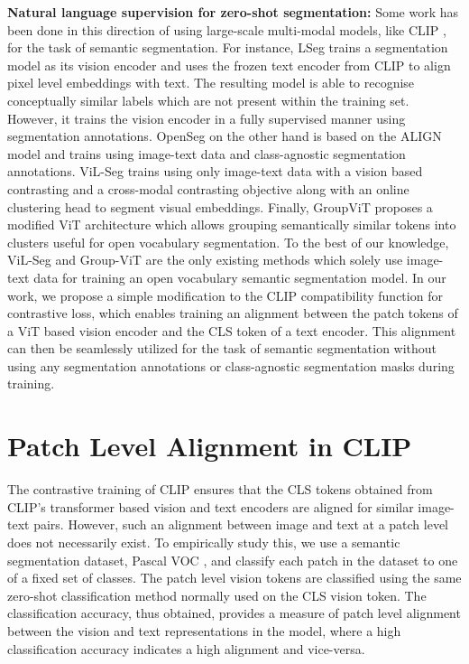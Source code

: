 \documentclass[10pt,twocolumn,letterpaper]{article}
\begin{document}
\textbf{Natural language supervision for zero-shot segmentation:} Some work has been done in this direction of using large-scale multi-modal models, like CLIP \cite{radford2021learning}, for the task of semantic segmentation. For instance, LSeg \cite{li2022language} trains a segmentation model as its vision encoder and uses the frozen text encoder from CLIP to align pixel level embeddings with text. The resulting model is able to recognise conceptually similar labels which are not present within the training set. However, it trains the vision encoder in a fully supervised manner using segmentation annotations. OpenSeg \cite{ghiasi2021open} on the other hand is based on the ALIGN \cite{jia2021scaling} model and trains using image-text data and class-agnostic segmentation annotations. ViL-Seg \cite{liu2022open} trains using only image-text data with a vision based contrasting and a cross-modal contrasting objective along with an online clustering head to segment visual embeddings. Finally, GroupViT \cite{xu2022groupvit} proposes a modified ViT architecture which allows grouping semantically similar tokens into clusters useful for open vocabulary segmentation. To the best of our knowledge, ViL-Seg and Group-ViT are the only existing methods which solely use image-text data for training an open vocabulary semantic segmentation model. In our work, we propose a simple modification to the CLIP compatibility function for contrastive loss, which enables training an alignment between the patch tokens of a ViT based vision encoder and the CLS token of a text encoder. This alignment can then be seamlessly utilized for the task of semantic segmentation without using any segmentation annotations or class-agnostic segmentation masks during training.

\section {Patch Level Alignment in CLIP}
\label{sec:clip_lacks_alignment}

The contrastive training of CLIP ensures that the CLS tokens obtained from CLIP's transformer based vision and text encoders are aligned for similar image-text pairs. However, such an alignment between image and text at a patch level does not necessarily exist. To empirically study this, we use a semantic segmentation dataset, Pascal VOC \cite{Everingham10}, and classify each patch in the dataset to one of a fixed set of classes. The patch level vision tokens are classified using the same zero-shot classification \cite{radford2021learning} method normally used on the CLS vision token. The classification accuracy, thus obtained, provides a measure of patch level alignment between the vision and text representations in the model, where a high classification accuracy indicates a high alignment and vice-versa.
\end{document}
